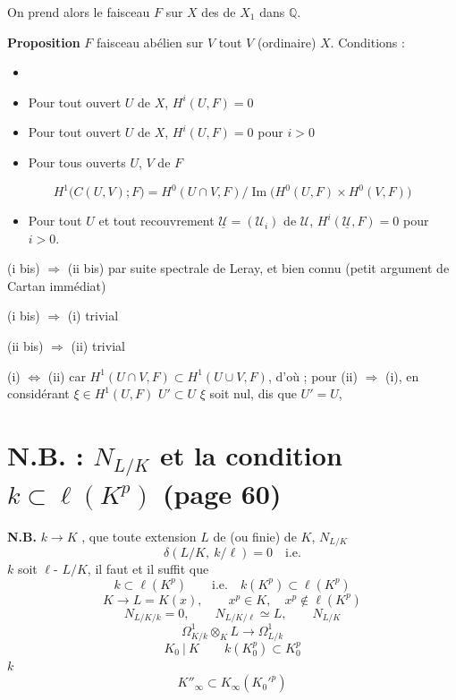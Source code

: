 \documentclass[11pt,a4paper]{article}
\begin{document}
On prend alors le faisceau $F$ \ill{} sur $X$ \ill{} des \ill{} de $X_{1}$
dans $\mathbb{Q}$.


\textbf{Proposition} $F$ faisceau abélien sur \ill{} $V$ \ill{} tout $V$
(ordinaire) $X$. Conditions :
\begin{itemize}
\item[(i)] \ill{}
\item[(i bis)] Pour tout ouvert $U$ de $X$, $H^{i}(U,F) = 0$
\item[(ii)] Pour tout ouvert $U$ de $X$, $H^{i}(U,F) = 0$ pour $i > 0$
\item[(iii)] Pour tous ouverts $U$, $V$ de $F$ 
\end{itemize}
\[
H^{1}\bigl(C(U,V); F\bigr) = H^{0}(U \cap V, F) \big/
\operatorname{Im}\bigl(H^{0}(U,F) \times H^{0}(V,F)\bigr)
\]
\begin{itemize}
\item[(ii bis)] Pour tout  $U$ et tout
recouvrement $\underline{\mathcal{U}} = (\mathcal{U}_{i})$ de
$\mathcal{U}$, \ill{} $H^{i}(\underline{\mathcal{U}}, F) = 0$ pour $i > 0$.
\end{itemize}

(i bis) $\Rightarrow$ (ii bis) par suite spectrale de Leray, et bien connu
(petit argument de Cartan \ill{} immédiat)

(i bis) $\Rightarrow$ (i) trivial

(ii bis) $\Rightarrow$ (ii) trivial

(i) $\Leftrightarrow$ (ii) car $H^{1}(U \cap V, F) \subset
H^{1}(U \cup V, F)$, d'où \ill{} ; pour (ii) $\Rightarrow$ (i), \ill{} en
considérant $\xi \in H^{1}(U,F)$  \ill{}
$U' \subset U$ \ill{} $\xi$ soit nul, \ill{} dis que $U' = U$, \ill{}

\section*{N.B. : $N_{L/K}$ et la condition $k \subset \ell(K^{p})$ (page 60)}


\textbf{N.B.} $k \to K$ \ill{}, \ill{} \ill{} que toute extension $L$ de
\ill{} (ou finie) de $K$, \ill{} $N_{L/K}$
\[
\delta(L/K,\ k/\ell) = 0 \quad \text{i.e.}
\]
$k$ soit $\ell$-\ill{} \ill{} $L/K$, il faut et il suffit que
\[
k \subset \ell(K^{p}) \qquad \text{i.e.} \quad k(K^{p}) \subset
\ell(K^{p})
\]
\ill{}
\[
K \to L = K(x), \qquad x^{p} \in K,\quad x^{p} \notin \ell(K^{p})
\]
\[
N_{L/K/k} = 0, \qquad N_{L/K/\ell} \simeq L, \qquad N_{L/K}
\]
\[
\Omega^{1}_{K/k} \otimes_{K} L \longrightarrow \Omega^{1}_{L/k}
\]
\[
K_{0} \ \big| \ K \qquad k(K_{0}^{p}) \subset K_{0}^{p}
\]
  $k$
\[
\boxed{\ K''_{\infty} \subset K_{\infty}(K_{0}'^{p})\ }
\]
 \ill{}
\end{document}
